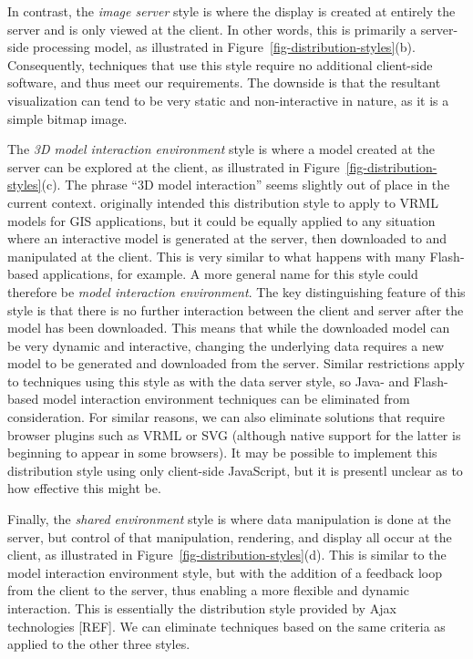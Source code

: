 \documentclass[acmtocl,acmnow]{acmtrans2m}
\begin{document}
In contrast, the \emph{image server} style is where the display is
created at entirely the server and is only viewed at the client. In
other words, this is primarily a server-side processing model, as
illustrated in Figure~\ref{fig-distribution-styles}(b). Consequently, techniques
that use this style require no additional client-side software, and thus
meet our requirements. The downside is that the resultant visualization
can tend to be very static and non-interactive in nature, as it is a
simple bitmap image.

The \emph{3D model interaction environment} style is where a model
created at the server can be explored at the client, as illustrated in
Figure~\ref{fig-distribution-styles}(c). The phrase ``3D model
interaction'' seems slightly out of place in the current context.
 originally intended this distribution style to
apply to VRML models for GIS applications, but it could be equally
applied to any situation where an interactive model is generated at the
server, then downloaded to and manipulated at the client. This is very
similar to what happens with many Flash-based applications, for example.
A more general name for this style could therefore be \emph{model
interaction environment}. The key distinguishing feature of this style
is that there is no further interaction between the client and server
after the model has been downloaded. This means that while the
downloaded model can be very dynamic and interactive, changing the
underlying data requires a new model to be generated and downloaded from
the server. Similar restrictions apply to techniques using this style as
with the data server style, so Java- and Flash-based model interaction
environment techniques can be eliminated from consideration. For similar
reasons, we can also eliminate solutions that require browser plugins
such as VRML or SVG (although native support for the latter is beginning
to appear in some browsers). It may be possible to implement this
distribution style using only client-side JavaScript, but it is presentl
unclear as to how effective this might be.


Finally, the \emph{shared environment} style is where data manipulation
is done at the server, but control of that manipulation, rendering, and
display all occur at the client, as illustrated in
Figure~\ref{fig-distribution-styles}(d). This is similar to the model
interaction environment style, but with the addition of a feedback loop
from the client to the server, thus enabling a more flexible and dynamic
interaction. This is essentially the distribution style provided by Ajax
technologies [REF]. We can eliminate techniques based on the same criteria
as applied to the other three styles.
\end{document}
